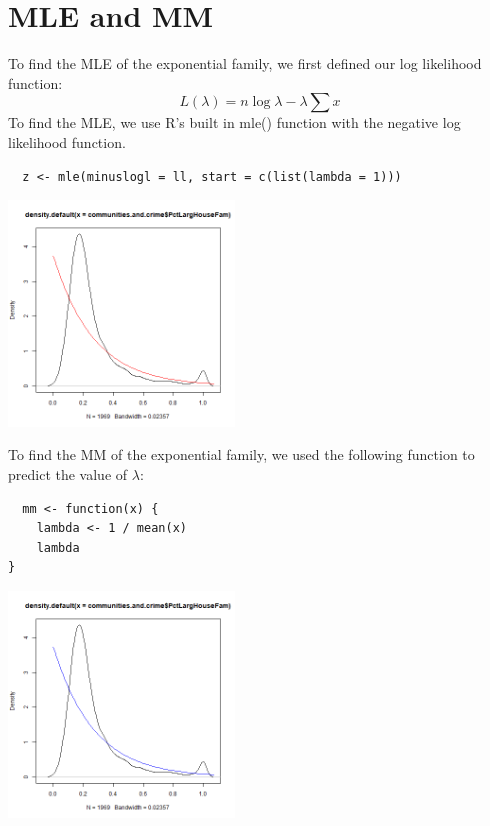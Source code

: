 \documentclass[12pt, letterpaper]{report}
\begin{document}
\section{MLE and MM}
To find the MLE of the exponential family, we first defined our log likelihood function:
\begin{equation}
  L(\lambda) = n \log{\lambda} - \lambda \sum{x}
\end{equation}
To find the MLE, we use R's built in mle() function with the negative log likelihood function. 
\begin{lstlisting}
  z <- mle(minuslogl = ll, start = c(list(lambda = 1)))
\end{lstlisting} 

\begin{center}
\includegraphics[width=0.45\textwidth]{exponential/PctLargHouseFam_mle}
\end{center}

To find the MM of the exponential family, we used the following function to predict the value of $\lambda$:
\begin{lstlisting}
  mm <- function(x) {
    lambda <- 1 / mean(x)
    lambda
}
\end{lstlisting}

\begin{center}
\includegraphics[width=0.45\textwidth]{exponential/PctLargHouseFam_mm}
\end{center}
\end{document}
